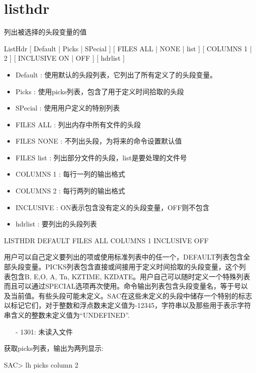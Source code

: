 \section{listhdr}
\label{cmd:listhdr}

列出被选择的头段变量的值

ListHdr [ Default | Picks | SPecial ] [ FILES ALL | NONE | list ] [ COLUMNS 1 | 2 ] [ INCLUSIVE ON | OFF ] [ hdrlist ]

\begin{itemize}
\item Default : 使用默认的头段列表，它列出了所有定义了的头段变量。
\item Picks : 使用picks列表，包含了用于定义时间拾取的头段 
\item SPecial :  使用用户定义的特别列表 
\item FILES ALL : 列出内存中所有文件的头段 
\item FILES NONE : 不列出头段，为将来的命令设置默认值 
\item FILES list : 列出部分文件的头段，list是要处理的文件号 
\item COLUMNS 1 : 每行一列的输出格式  
\item COLUMNS 2 : 每行两列的输出格式  
\item INCLUSIVE :  ON表示包含没有定义的头段变量，OFF则不包含 
\item hdrlist : 要列出的头段列表  
\end{itemize}

LISTHDR DEFAULT FILES ALL COLUMNS 1 INCLUSIVE OFF

用户可以自己定义要列出的项或使用标准列表中的任一个，DEFAULT列表包含全部头段变量。PICKS列表包含直接或间接用于定义时间拾取的头段变量，这个列表包含B, E,O, A, Tn, KZTIME, KZDATE。用户自己可以随时定义一个特殊列表而且可以通过SPECIAL选项再次使用。命令输出列表包含头段变量名，等于号以及当前值。有些头段可能未定义。SAC在这些未定义的头段中储存一个特别的标志以标记它们，对于整数和浮点数未定义值为-12345，字符串以及那些用于表示字符串含义的整数未定义值为``UNDEFINED''.

\begin{itemize}
\item[-]1301: 未读入文件
\end{itemize}

获取picks列表，输出为两列显示:
\begin{SACCode}
SAC> lh picks column 2
\end{SACCode}

